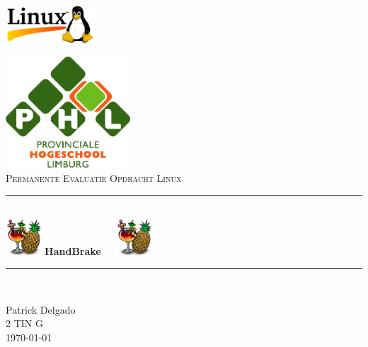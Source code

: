 \documentclass[openbib, 12pt]{article}
\newcommand{\HRule}{\rule{\linewidth}{0.7mm}}
\begin{document}
\begin{titlepage}
\begin{center}
\begin{flushright}
\includegraphics[width=0.25\textwidth]{linux-logo.jpg}\\[1cm]
\end{flushright}

\includegraphics[width=0.35\textwidth]{phl-logo.jpg}\\[1.5cm]


\textsc{\LARGE Permanente Evaluatie Opdracht Linux}\\[0.5cm]

\HRule \\[0.5cm]
\includegraphics[width=0.10\textwidth]{Handbrake-logo.png} { \huge \bfseries \textbf{ HandBrake}}\ \ \  \includegraphics[width=0.10\textwidth]{Handbrake-logo.png}\\[0.4cm]
\HRule \\[1.5cm]

\vfill

\begin{flushright}
\Large {Patrick Delgado\\
2 TIN G\\
\today}

\end{flushright}

\end{center}
\end{titlepage}


\tableofcontents
\newpage

\listoffigures
\newpage
\listoftables
\newpage


\shadowsectionbox







\newpage


\newpage
\printindex
\newpage


\end{document}
